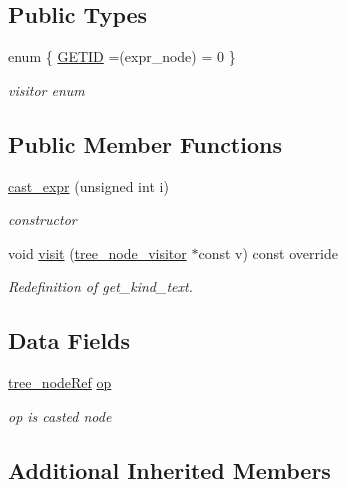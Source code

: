 \subsection*{Public Types}
\begin{DoxyCompactItemize}
\item 
enum \{ \hyperlink{structcast__expr_aef99e977b5cf66f799bad8db6c622681a16bf48fe336bba424560dec3e8ff4502}{G\+E\+T\+ID} =(expr\+\_\+node) = 0
 \}\begin{DoxyCompactList}\small\item\em visitor enum \end{DoxyCompactList}
\end{DoxyCompactItemize}
\subsection*{Public Member Functions}
\begin{DoxyCompactItemize}
\item 
\hyperlink{structcast__expr_a60607b1dde6f6ed9e126b16910768dd4}{cast\+\_\+expr} (unsigned int i)
\begin{DoxyCompactList}\small\item\em constructor \end{DoxyCompactList}\item 
void \hyperlink{structcast__expr_a6f67dad818bc71c65e92f9105faf29f6}{visit} (\hyperlink{classtree__node__visitor}{tree\+\_\+node\+\_\+visitor} $\ast$const v) const override
\begin{DoxyCompactList}\small\item\em Redefinition of get\+\_\+kind\+\_\+text. \end{DoxyCompactList}\end{DoxyCompactItemize}
\subsection*{Data Fields}
\begin{DoxyCompactItemize}
\item 
\hyperlink{tree__node_8hpp_a6ee377554d1c4871ad66a337eaa67fd5}{tree\+\_\+node\+Ref} \hyperlink{structcast__expr_a8dc715dac26ea43a7d5e457ceaac5a6f}{op}
\begin{DoxyCompactList}\small\item\em op is casted node \end{DoxyCompactList}\end{DoxyCompactItemize}
\subsection*{Additional Inherited Members}


